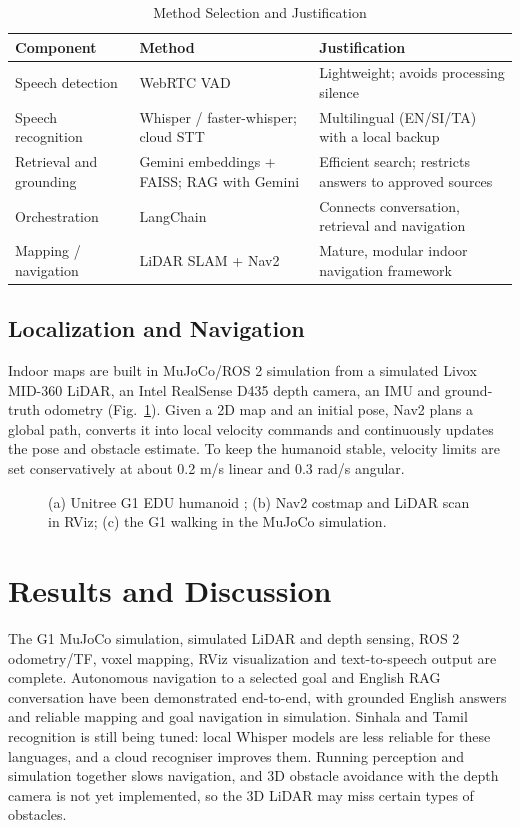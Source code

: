 \documentclass[conference]{IEEEtran}
\begin{document}
\begin{table}[htbp]
\caption{Method Selection and Justification}
\label{tab:methods}
\centering
\begin{tabular}{|p{1.6cm}|p{2.1cm}|p{3.0cm}|}
\hline
\textbf{Component} & \textbf{Method} & \textbf{Justification} \\
\hline
Speech detection & WebRTC VAD & Lightweight; avoids processing silence \\
\hline
Speech recognition & Whisper / faster-whisper; cloud STT & Multilingual (EN/SI/TA) with a local backup \\
\hline
Retrieval and grounding & Gemini embeddings + FAISS; RAG with Gemini & Efficient search; restricts answers to approved sources \\
\hline
Orchestration & LangChain & Connects conversation, retrieval and navigation \\
\hline
Mapping / navigation & LiDAR SLAM + Nav2 & Mature, modular indoor navigation framework \\
\hline
\end{tabular}
\end{table}

\subsection{Localization and Navigation}
Indoor maps are built in MuJoCo/ROS 2 simulation from a simulated Livox MID-360 LiDAR, an Intel RealSense D435 depth camera, an IMU and ground-truth odometry (Fig.~\ref{fig:g1sim}). Given a 2D map and an initial pose, Nav2 plans a global path, converts it into local velocity commands and continuously updates the pose and obstacle estimate. To keep the humanoid stable, velocity limits are set conservatively at about 0.2 m/s linear and 0.3 rad/s angular.

\begin{figure}[htbp]
\centering
\caption{(a) Unitree G1 EDU humanoid \cite{unitree_g1}; (b) Nav2 costmap and LiDAR scan in RViz; (c) the G1 walking in the MuJoCo simulation.}
\label{fig:g1sim}
\end{figure}

\section{Results and Discussion}
The G1 MuJoCo simulation, simulated LiDAR and depth sensing, ROS 2 odometry/TF, voxel mapping, RViz visualization and text-to-speech output are complete. Autonomous navigation to a selected goal and English RAG conversation have been demonstrated end-to-end, with grounded English answers and reliable mapping and goal navigation in simulation. Sinhala and Tamil recognition is still being tuned: local Whisper models are less reliable for these languages, and a cloud recogniser improves them. Running perception and simulation together slows navigation, and 3D obstacle avoidance with the depth camera is not yet implemented, so the 3D LiDAR may miss certain types of obstacles.
\end{document}
